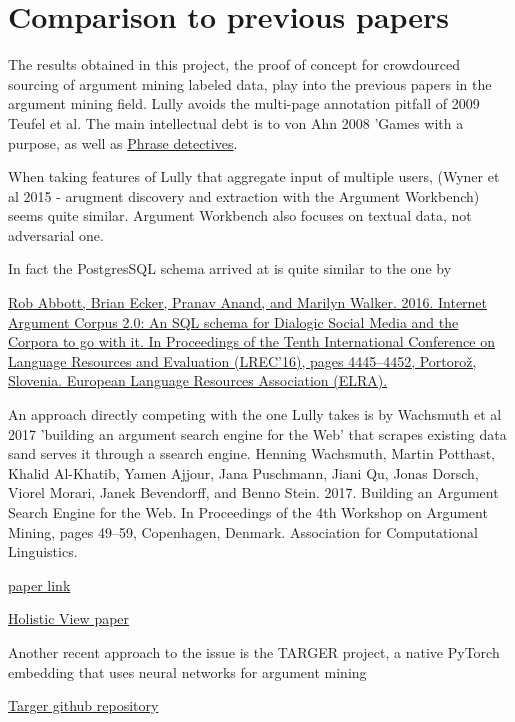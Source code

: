 \documentclass{article}
\begin{document}
\section{Comparison to previous papers}
The results obtained in this project, the proof of concept for crowdourced sourcing of argument mining labeled data, play into the previous papers in the argument mining field.
Lully avoids the multi-page annotation pitfall of 2009 Teufel et al.
The main intellectual debt is to von Ahn 2008 'Games with a purpose, as well as \href{https://dl.acm.org/doi/10.1145/2448116.2448119}{Phrase detectives}.

When taking features of Lully that aggregate input of multiple users, (Wyner et al 2015 - arugment discovery and extraction with the Argument Workbench) seems quite similar. Argument Workbench also focuses on textual data, not adversarial one. 

In fact the PostgresSQL schema arrived at is quite similar to the one by 

\href{ https://aclanthology.org/L16-1704/ }{ Rob Abbott, Brian Ecker, Pranav Anand, and Marilyn Walker. 2016. Internet Argument Corpus 2.0: An SQL schema for Dialogic Social Media and the Corpora to go with it. In Proceedings of the Tenth International Conference on Language Resources and Evaluation (LREC'16), pages 4445–4452, Portorož, Slovenia. European Language Resources Association (ELRA).  }

An approach directly competing with the one Lully takes is by Wachsmuth et al 2017 'building an argument search engine for the Web' that scrapes existing data sand serves it through a ssearch engine.
Henning Wachsmuth, Martin Potthast, Khalid Al-Khatib, Yamen Ajjour, Jana Puschmann, Jiani Qu, Jonas Dorsch, Viorel Morari, Janek Bevendorff, and Benno Stein. 2017. Building an Argument Search Engine for the Web. In Proceedings of the 4th Workshop on Argument Mining, pages 49–59, Copenhagen, Denmark. Association for Computational Linguistics.

\href{ https://aclanthology.org/W17-5106.pdf }{paper link}

\href{https://www.semanticscholar.org/paper/Towards-a-Holistic-View-on-Argument-Quality-Fromm-Berrendorf/660fcd097881e7388f91b3724cdb0e2aeb9ff688}{Holistic View paper}

Another recent approach to the issue is the TARGER project, a native PyTorch embedding that uses neural networks for argument mining

\href{https://github.com/achernodub/targer}{Targer github repository}
\end{document}
